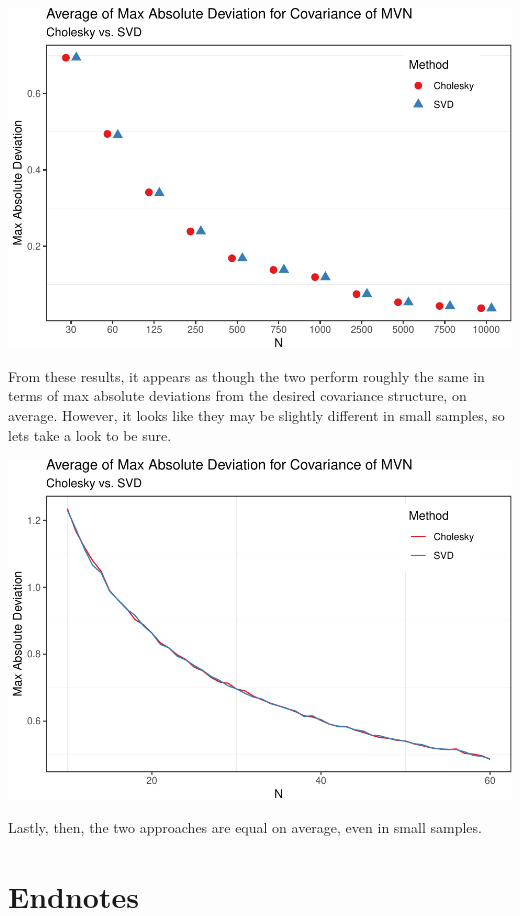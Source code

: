 \documentclass[
]{article}
\begin{document}
\includegraphics{mvnorm_files/figure-latex/unnamed-chunk-6-1.pdf}

\hfill\break

From these results, it appears as though the two perform roughly the
same in terms of max absolute deviations from the desired covariance
structure, on average. However, it looks like they may be slightly
different in small samples, so lets take a look to be sure.

\hfill\break

\includegraphics{mvnorm_files/figure-latex/unnamed-chunk-7-1.pdf}

Lastly, then, the two approaches are equal on average, even in small
samples.

\hypertarget{endnotes}{%
\section{Endnotes}\label{endnotes}}
\end{document}
